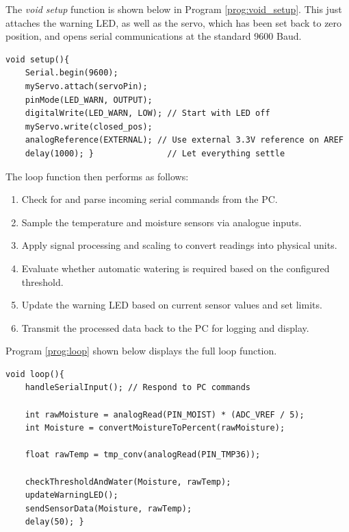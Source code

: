 \documentclass[a4paper,11pt]{article}
\begin{document}
The \textit{void setup} function is shown below in 
Program \ref{prog:void_setup}. 
This just attaches the warning LED,
as well as the servo, which has been set back to zero position,
and opens serial communications at the standard 9600 Baud.

\begin{lstlisting}[style=cpp-style, 
    caption={\textit{void setup} function}, label={prog:void_setup}]
void setup(){
    Serial.begin(9600);
    myServo.attach(servoPin);
    pinMode(LED_WARN, OUTPUT);
    digitalWrite(LED_WARN, LOW); // Start with LED off
    myServo.write(closed_pos);
    analogReference(EXTERNAL); // Use external 3.3V reference on AREF
    delay(1000); }               // Let everything settle
\end{lstlisting}

The loop function then performs as follows: 

\begin{enumerate}[label=\Roman*., nosep]
    \item Check for and parse incoming serial commands from the PC.
    \item Sample the temperature and moisture sensors via analogue inputs.
    \item Apply signal processing and scaling to convert 
    readings into physical units.
    \item Evaluate whether automatic watering is required based on the configured threshold.
    \item Update the warning LED based on current sensor values and set limits.
    \item Transmit the processed data back to the PC for logging and display.
\end{enumerate}

Program \ref{prog:loop} shown below displays the full loop function.

\begin{lstlisting}[style=cpp-style, 
    caption={Main \textit{loop} function}, label={prog:loop}]
void loop(){
    handleSerialInput(); // Respond to PC commands

    int rawMoisture = analogRead(PIN_MOIST) * (ADC_VREF / 5);
    int Moisture = convertMoistureToPercent(rawMoisture);

    float rawTemp = tmp_conv(analogRead(PIN_TMP36));

    checkThresholdAndWater(Moisture, rawTemp);
    updateWarningLED();
    sendSensorData(Moisture, rawTemp);
    delay(50); }
\end{lstlisting}
\end{document}
